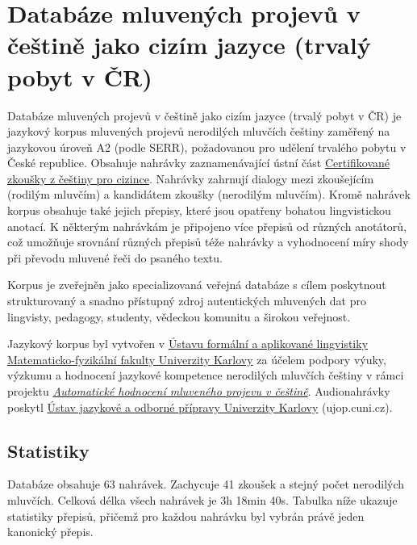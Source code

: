 \documentclass[
]{article}
\author{}
\date{}
\begin{document}
\hypertarget{databuxe1ze-mluvenuxfdch-projevux16f-v-ux10deux161tinux11b-jako-cizuxedm-jazyce-trvaluxfd-pobyt-v-ux10dr}{%
\section{Databáze mluvených projevů v češtině jako cizím jazyce (trvalý
pobyt v
ČR)}\label{databuxe1ze-mluvenuxfdch-projevux16f-v-ux10deux161tinux11b-jako-cizuxedm-jazyce-trvaluxfd-pobyt-v-ux10dr}}

Databáze mluvených projevů v češtině jako cizím jazyce (trvalý pobyt v
ČR) je jazykový korpus mluvených projevů nerodilých mluvčích češtiny
zaměřený na jazykovou úroveň A2 (podle SERR), požadovanou pro udělení
trvalého pobytu v České republice. Obsahuje nahrávky zaznamenávající
ústní část \href{http://ujop.cuni.cz/cce}{Certifikované zkoušky z
češtiny pro cizince}. Nahrávky zahrnují dialogy mezi zkoušejícím
(rodilým mluvčím) a kandidátem zkoušky (nerodilým mluvčím). Kromě
nahrávek korpus obsahuje také jejich přepisy, které jsou opatřeny
bohatou lingvistickou anotací. K některým nahrávkám je připojeno více
přepisů od různých anotátorů, což umožňuje srovnání různých přepisů téže
nahrávky a vyhodnocení míry shody při převodu mluvené řeči do psaného
textu.

Korpus je zveřejněn jako specializovaná veřejná databáze s cílem
poskytnout strukturovaný a snadno přístupný zdroj autentických mluvených
dat pro lingvisty, pedagogy, studenty, vědeckou komunitu a širokou
veřejnost.

Jazykový korpus byl vytvořen v \href{https://ufal.mff.cuni.cz/}{Ústavu
formální a aplikované lingvistiky Matematicko-fyzikální fakulty
Univerzity Karlovy} za účelem podpory výuky, výzkumu a hodnocení
jazykové kompetence nerodilých mluvčích češtiny v rámci projektu
\href{https://ufal.mff.cuni.cz/automated-speech-scoring-czech}{\emph{Automatické
hodnocení mluveného projevu v češtině}}. Audionahrávky poskytl
\href{https://ujop.cuni.cz/}{Ústav jazykové a odborné přípravy
Univerzity Karlovy} (ujop.cuni.cz).

\hypertarget{statistiky}{%
\subsection{Statistiky}\label{statistiky}}

Databáze obsahuje 63 nahrávek. Zachycuje 41 zkoušek a stejný počet
nerodilých mluvčích. Celková délka všech nahrávek je 3h 18min 40s.
Tabulka níže ukazuje statistiky přepisů, přičemž pro každou nahrávku byl
vybrán právě jeden kanonický přepis.
\end{document}
